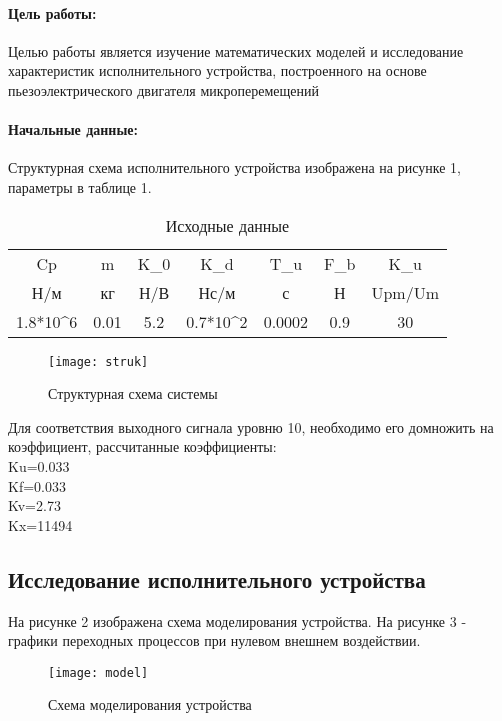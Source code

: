 \documentclass[a4paper, 12pt]{article}
\begin{document}
	
\paragraph{Цель работы:} Целью работы является изучение математических моделей и исследование характеристик исполнительного устройства, построенного на основе пьезоэлектрического двигателя микроперемещений\\
\paragraph{Начальные данные:}
	Структурная схема исполнительного устройства изображена на рисунке 1, параметры в таблице 1.
	\begin{table}[h!]
	\caption{Исходные данные}
	\renewcommand{\arraystretch}{1}
	\renewcommand{\tabcolsep}{0.7cm}
	\begin{tabular}{|c|c|c|c|c|c|c|}
		\hline
		Cp & m & K_0 & K_d & T_u & F_b & K_u\\
		
		Н/м&	кг&	Н/В&	Нс/м&	с&	Н&	Upm/Um\\
		\hline
		1.8*10^6&	0.01&	5.2&	0.7*10^2&	0.0002&	0.9&	30\\
		\hline
	\end{tabular}
\end{table}\par
\begin{figure}[h]
	\begin{center}
		\texttt{[image: struk]}
		\caption{Структурная схема системы}
	\end{center}  
\end{figure}\par
Для соответствия выходного сигнала уровню 10, необходимо его домножить на коэффициент, рассчитанные коэффициенты:\\
Ku=0.033\\
Kf=0.033\\
Kv=2.73\\
Kx=11494 
\newpage
\begin{center}
\section{Исследование исполнительного устройства}
\end{center}\par
На рисунке 2 изображена схема моделирования устройства. На рисунке 3 - графики переходных процессов при нулевом внешнем воздействии.
\begin{figure}[h!]
\begin{center}
\texttt{[image: model]}
\caption{Схема моделирования устройства}
\end{center}  
\end{figure}\par
\end{document}
